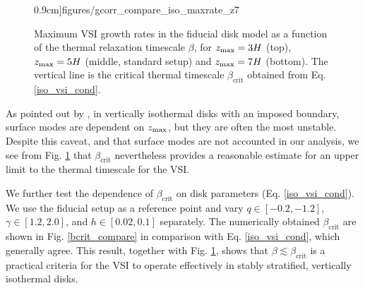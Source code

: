 \begin{figure}
  0.9cm]{figures/gcorr_compare_iso_maxrate_z7}  
  \caption{Maximum VSI growth rates in the fiducial disk 
     model as a function of the thermal relaxation timescale
     $\beta$, for $z_\mathrm{max}=3H$ (top), $z_\mathrm{max}=5H$ (middle, standard
     setup) and $z_\mathrm{max}=7H$ (bottom). The vertical line is the
     critical thermal timescale $\beta_\mathrm{crit}$ obtained  
     from Eq. \ref{iso_vsi_cond}. 
     \label{bcrit_compare1}}   
 \end{figure} 

As pointed out by , in vertically isothermal disks with
an imposed boundary, surface modes are dependent on $z_\mathrm{max}$, but they
are often the most unstable. Despite this caveat, and that surface
modes are not accounted in our analysis, we see from
Fig. \ref{bcrit_compare1} that $\beta_\mathrm{crit}$ nevertheless
provides a reasonable estimate for an upper limit to the thermal
timescale for the VSI.  

We further  test the dependence of $\beta_\mathrm{crit}$ on disk parameters
(Eq. \ref{iso_vsi_cond}).  We use the fiducial setup as a  reference
point and vary $q\in[-0.2,-1.2]$,  $\gamma\in[1.2,2.0]$, and
$ h\in[0.02,0.1]$ separately. The numerically obtained
$\beta_\mathrm{crit}$ are shown in Fig. \ref{bcrit_compare} in
comparison with Eq. \ref{iso_vsi_cond}, which generally agree. This
result, together with Fig. \ref{bcrit_compare1}, shows that  
$\beta \lesssim \beta_\mathrm{crit}$ is a practical
criteria for the VSI to operate effectively in stably stratified,
vertically isothermal disks.   



